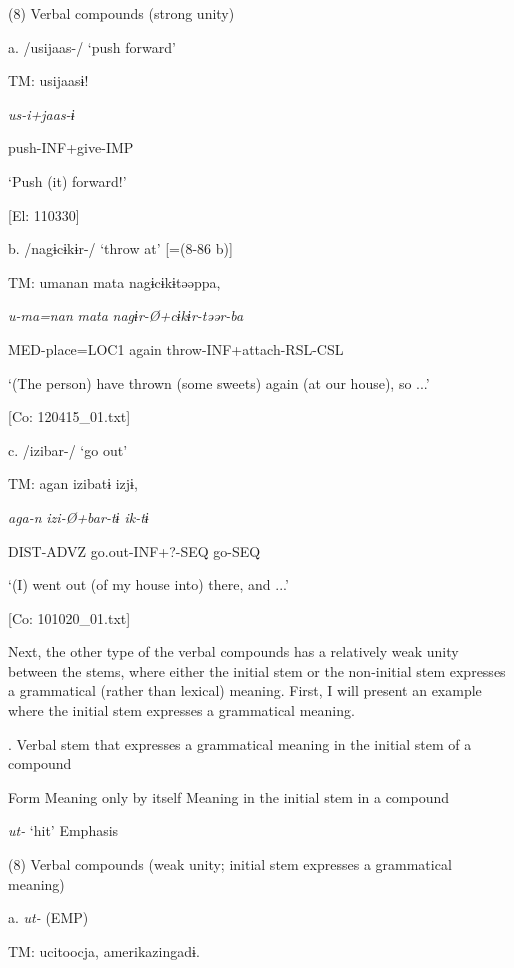 (8)  Verbal compounds (strong unity)

  a.  /usijaas-/ ‘push forward’

    TM:  usijaasɨ!

      \textit{us-i+jaas{}-ɨ}

      push-INF+give-IMP

      ‘Push (it) forward!’

      [El: 110330]

  b.  /nagɨcɨkɨr-/ ‘throw at’ [=(8-86 b)]

    TM:  umanan  mata  nagɨcɨkɨtəəppa,

      \textit{u-ma=nan}  \textit{mata}  \textit{nagɨr-Ø+cɨkɨr{}-təər-ba}

      MED-place=LOC1  again  throw-INF+attach-RSL-CSL

      ‘(The person) have thrown (some sweets) again (at our house), so ...’

      [Co: 120415\_01.txt]

  c.  /izibar-/ ‘go out’

    TM:  agan  izibatɨ  izjɨ,

      \textit{aga-n}  \textit{izi-Ø+bar{}-tɨ  ik-tɨ}

      DIST-ADVZ  go.out-INF+?-SEQ  go-SEQ

      ‘(I) went out (of my house into) there, and ...’

      [Co: 101020\_01.txt]

  Next, the other type of the verbal compounds has a relatively weak unity between the stems, where either the initial stem or the non-initial stem expresses a grammatical (rather than lexical) meaning. First, I will present an example where the initial stem expresses a grammatical meaning.

\begin{styleBeschriftung}
\textmd{. Verbal stem that expresses a grammatical meaning in the initial stem of a compound}
\end{styleBeschriftung}

Form    Meaning only by itself    Meaning in the initial stem in a compound

\textit{ut-}    ‘hit’    Emphasis

(8)  Verbal compounds (weak unity; initial stem expresses a grammatical meaning)

  a.  \textit{ut-} (EMP)

    TM:  ucitoocja,  {\textbar}amerikazin{\textbar}gadɨ.

